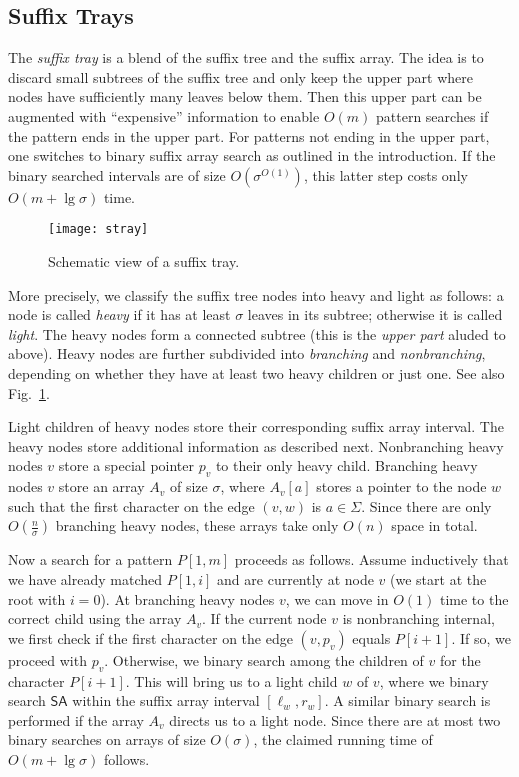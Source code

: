 \documentclass[11pt,onecolumn,final]{article} \usepackage{a4}
\newcommand{\SA}[0]{\mathsf{SA}} \newcommand{\ST}[0]{\mathcal{ST}} \newcommand{\SF}[1]{T^{#1}} \newcommand{\pred}{\textsc{Pred}}
\theoremstyle{plain}
\theoremstyle{remark}
\begin{document}
\subsection{Suffix Trays}
\label{sect:stray}
The \emph{suffix tray} \cite{cole06suffix} is a blend of the suffix tree and the suffix array. The idea is to discard small subtrees of the suffix tree and only keep the upper part where nodes have sufficiently many leaves below them. Then this upper part can be augmented with ``expensive'' information to enable $O(m)$ pattern searches if the pattern ends in the upper part. For patterns not ending in the upper part, one switches to binary suffix array search as outlined in the introduction. If the binary searched intervals are of size $O(\sigma^{O(1)})$, this latter step costs only $O(m+\lg \sigma)$ time.

\begin{figure}
\centering
\texttt{[image: stray]}
\caption{Schematic view of a suffix tray.}
\label{fig:stray}
\end{figure}

More precisely, we classify the suffix tree nodes into heavy and light as follows: a node is called \emph{heavy} if it has at least $\sigma$ leaves in its subtree; otherwise it is called \emph{light}. The heavy nodes form a connected subtree (this is the \emph{upper part} aluded to above). Heavy nodes are further subdivided into \emph{branching} and \emph{nonbranching}, depending on whether they have at least two heavy children or just one. See also Fig.~\ref{fig:stray}.

Light children of heavy nodes store their corresponding suffix array interval. The heavy nodes store additional information as described next. Nonbranching heavy nodes $v$ store a special pointer $p_v$ to their only heavy child. Branching heavy nodes $v$ store an array $A_v$ of size $\sigma$, where $A_v[a]$ stores a pointer to the node $w$ such that the first character on the edge $(v,w)$ is $a\in\Sigma$. Since there are only $O(\frac{n}{\sigma})$ branching heavy nodes, these arrays take only $O(n)$ space in total.

Now a search for a pattern $P[1,m]$ proceeds as follows. Assume inductively that we have already matched $P[1,i]$ and are currently at node $v$ (we start at the root with $i=0$). At branching heavy nodes $v$, we can move in $O(1)$ time to the correct child using the array $A_v$. If the current node $v$ is nonbranching internal, we first check if the first character on the edge $(v,p_v)$ equals $P[i+1]$. If so, we proceed with $p_v$. Otherwise, we binary search among the children of $v$ for the character $P[i+1]$. This will bring us to a light child $w$ of $v$, where we binary search $\SA$ within the suffix array interval $[\ell_w, r_w]$. A similar binary search is performed if the array $A_v$ directs us to a light node. Since there are at most two binary searches on arrays of size $O(\sigma)$, the claimed running time of $O(m+\lg\sigma)$ follows.
\end{document}

